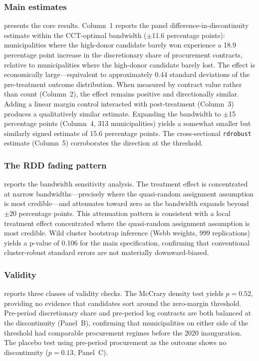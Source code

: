 \documentclass[12pt]{article}
\begin{document}
\subsubsection*{Main estimates}  presents the core results. Column~1 reports the panel difference-in-discontinuity estimate within the CCT-optimal bandwidth ($\pm$11.6 percentage points): municipalities where the high-donor candidate barely won experience a 18.9 percentage point increase in the discretionary share of procurement contracts, relative to municipalities where the high-donor candidate barely lost. The effect is economically large---equivalent to approximately 0.44 standard deviations of the pre-treatment outcome distribution. When measured by contract value rather than count (Column~2), the effect remains positive and directionally similar. Adding a linear margin control interacted with post-treatment (Column~3) produces a qualitatively similar estimate. Expanding the bandwidth to $\pm$15 percentage points (Column~4, 313 municipalities) yields a somewhat smaller but similarly signed estimate of 15.6 percentage points. The cross-sectional \texttt{rdrobust} estimate (Column~5) corroborates the direction at the threshold.



\subsubsection*{The RDD fading pattern}  reports the bandwidth sensitivity analysis. The treatment effect is concentrated at narrow bandwidths---precisely where the quasi-random assignment assumption is most credible---and attenuates toward zero as the bandwidth expands beyond $\pm$20 percentage points. This attenuation pattern is consistent with a local treatment effect concentrated where the quasi-random assignment assumption is most credible. Wild cluster bootstrap inference (Webb weights, 999 replications) yields a p-value of 0.106 for the main specification, confirming that conventional cluster-robust standard errors are not materially downward-biased.



\subsubsection*{Validity}  reports three classes of validity checks. The McCrary density test yields $p = 0.52$, providing no evidence that candidates sort around the zero-margin threshold. Pre-period discretionary share and pre-period log contracts are both balanced at the discontinuity (Panel~B), confirming that municipalities on either side of the threshold had comparable procurement regimes before the 2020 inauguration. The placebo test using pre-period procurement as the outcome shows no discontinuity ($p = 0.13$, Panel~C).
\end{document}
